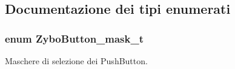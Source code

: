 \subsection{Documentazione dei tipi enumerati}
\hypertarget{group___button_ga4d26a5f6cad606de534ba034e0ba42dd}{
\subsubsection[{Zybo\+Button\+\_\+mask\+\_\+t}]{\setlength{\rightskip}{0pt plus 5cm}enum {\bf Zybo\+Button\+\_\+mask\+\_\+t}}}\label{group___button_ga4d26a5f6cad606de534ba034e0ba42dd}


Maschere di selezione dei Push\+Button. 

